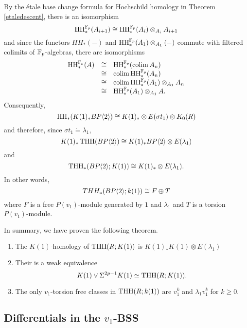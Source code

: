 By the \'etale base change formula for Hochschild homology in Theorem \ref{etaledescent}, there is an isomorphism 
\[ \operatorname{HH}_*^{\mathbb{F}_p}(A_{i+1})\cong \operatorname{HH}_*^{\mathbb{F}_p}(A_i)\otimes_{A_i}A_{i+1}\]
and since the functors $HH_*(-)$ and $ \operatorname{HH}_*^{\mathbb{F}_p}(A_1)\otimes_{A_1}(-)$ commute with filtered colimits of $\mathbb{F}_p$-algebras, there are isomorphisms 
	\[ 
	\begin{array}{rcl} 
		\operatorname{HH}_*^{\mathbb{F}_p}(A) & \cong &\operatorname{HH}_*^{\mathbb{F}_p}(\operatorname*{colim} A_n) \\
				         & \cong & \operatorname*{colim}  \operatorname{HH}_*^{\mathbb{F}_p}(A_n) \\
				         & \cong & \operatorname*{colim} \operatorname{HH}_*^{\mathbb{F}_p}(A_1)\otimes_{A_1}A_n \\
				         & \cong & \operatorname{HH}_*^{\mathbb{F}_p}(A_1)\otimes_{A_1}A. \\
	\end{array}
	\]
Consequently,
\[ \operatorname{HH}_*(K(1)_*BP\langle 2 \rangle)\cong K(1)_*\otimes E(\sigma t_1)\otimes K_0(R) \]
and therefore, since $\sigma t_1\dot{=}\lambda_1$, 
\[ K(1)_*\operatorname{THH}(BP\langle 2 \rangle)\cong K(1)_*BP\langle 2 \rangle\otimes E(\lambda_1) \]
and 
\[ \operatorname{THH}_*(BP\langle 2 \rangle;K(1))\cong K(1)_*\otimes E(\lambda_1). \]
In other words, 
\[ THH_*(BP\langle 2 \rangle;k(1)) \cong F\oplus T\]
where $F$ is a free $P(v_1)$-module generated by $1$ and $\lambda_1$ and $T$ is a torsion $P(v_1)$-module. 
\begin{comment}	
We therefore have the input needed to compute the Eilenberg-Moore spectral sequence,
\[
\Tor^{K(1)_*R}(K(1)_*K(1), K(1)_*\THH(R))\implies K(1)_*\THH(R;K(1))
\]
From the previous computation, the $E^2$-term is concentrated in $\Tor_0$ and is 
\[
K(1)_*K(1)\otimes E(\lambda_1).
\]		         
Thus, every class besides $1$ and $\lambda_1$ is $v_1$-torsion in $\THH_*(R;k(1))$. Since $\THH(R;K(1))$ is a $K(1)$-module, this implies that 
\[
\THH(R;K(1))\simeq K(1)\vee \Sigma^{2p-1}K(1).
\]
\end{comment}
In summary, we have proven the following theorem.
\begin{thm}\label{thm:K(1)coeff}\mbox{}
	\begin{enumerate}
		\item The $K(1)$-homology of $\operatorname{THH}(R;K(1))$ is $K(1)_*K(1)\otimes E(\lambda_1)$
		\item Their is a weak equivalence
		\[ K(1)\vee \Sigma^{2p-1}K(1)\simeq \operatorname{THH}(R;K(1)).\]
		\item The only $v_1$-torsion free classes in $\operatorname{THH}(R;k(1))$ are $v_1^k$ and $\lambda_1v_1^k$ for $k\ge0$.
	\end{enumerate}
\end{thm}

\subsection{Differentials in the $v_1$-BSS}

